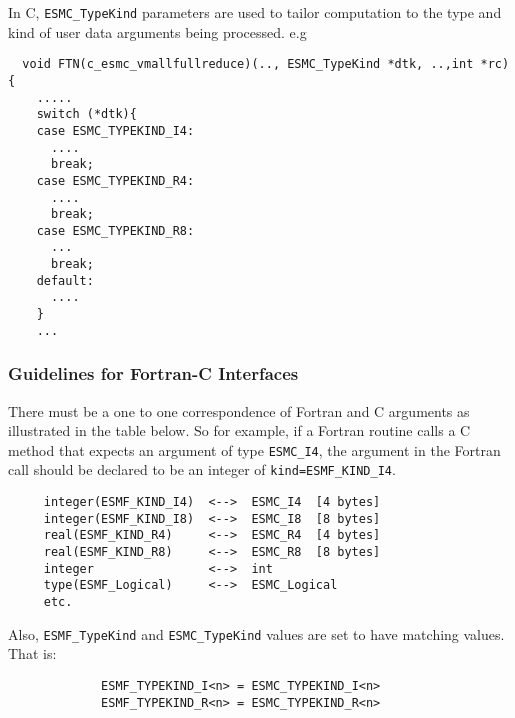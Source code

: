 In C, {\tt ESMC\_TypeKind} parameters are used to tailor computation to the type and kind of user data arguments being processed. e.g
\begin{verbatim}
  void FTN(c_esmc_vmallfullreduce)(.., ESMC_TypeKind *dtk, ..,int *rc){
    .....      
    switch (*dtk){
    case ESMC_TYPEKIND_I4:
      ....
      break;
    case ESMC_TYPEKIND_R4:
      ....
      break;
    case ESMC_TYPEKIND_R8:
      ...         
      break;
    default:
      ....
    }
    ...
\end{verbatim}

\subsubsection{Guidelines for Fortran-C Interfaces}

There must be a one to one correspondence of Fortran and C arguments as illustrated in the table below. So for example, if a Fortran routine calls a C method that expects an argument of type {\tt ESMC\_I4}, the argument in the Fortran call should be declared to be an integer of {\tt kind=ESMF\_KIND\_I4}.
\begin{verbatim}
     integer(ESMF_KIND_I4)  <-->  ESMC_I4  [4 bytes]
     integer(ESMF_KIND_I8)  <-->  ESMC_I8  [8 bytes]
     real(ESMF_KIND_R4)     <-->  ESMC_R4  [4 bytes]
     real(ESMF_KIND_R8)     <-->  ESMC_R8  [8 bytes]
     integer                <-->  int
     type(ESMF_Logical)     <-->  ESMC_Logical
     etc.
\end{verbatim}
Also, {\tt ESMF\_TypeKind} and {\tt ESMC\_TypeKind} values are set to have matching values. That is:
\begin{verbatim}
             ESMF_TYPEKIND_I<n> = ESMC_TYPEKIND_I<n>
             ESMF_TYPEKIND_R<n> = ESMC_TYPEKIND_R<n>
\end{verbatim}
















